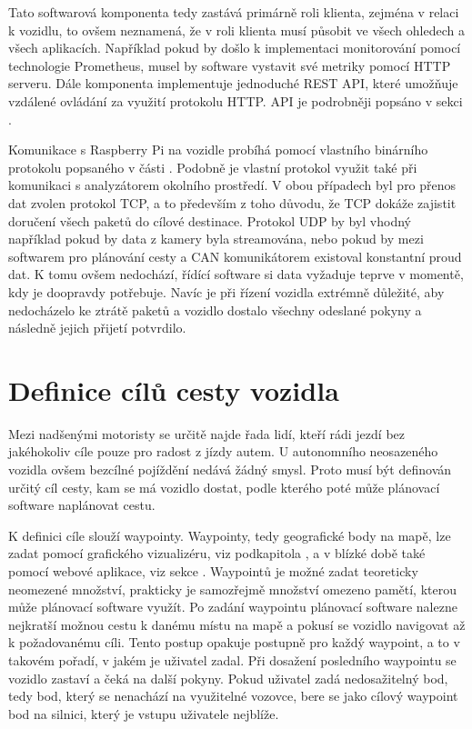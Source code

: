\documentclass[czech, bachelor]{diploma}
\begin{document}
Tato softwarová komponenta tedy zastává primárně roli klienta, zejména v relaci k vozidlu, to ovšem neznamená, že v roli klienta
musí působit ve všech ohledech a všech aplikacích. Například pokud by došlo k implementaci monitorování pomocí technologie
Prometheus, musel by software vystavit své metriky pomocí HTTP serveru. Dále komponenta implementuje jednoduché REST API, které
umožňuje vzdálené ovládání za využití protokolu HTTP. API je podrobněji popsáno v sekci .

Komunikace s Raspberry Pi na vozidle probíhá pomocí vlastního binárního protokolu popsaného v části .
Podobně je vlastní protokol využit také při komunikaci s analyzátorem okolního prostředí. V obou případech byl pro přenos dat
zvolen protokol TCP, a to především z toho důvodu, že TCP dokáže zajistit doručení všech paketů do cílové destinace. Protokol UDP
by byl vhodný například pokud by data z kamery byla streamována, nebo pokud by mezi softwarem pro plánování cesty a CAN
komunikátorem existoval konstantní proud dat. K tomu ovšem nedochází, řídící software si data vyžaduje teprve v momentě, kdy je
doopravdy potřebuje. Navíc je při řízení vozidla extrémně důležité, aby nedocházelo ke ztrátě paketů a vozidlo dostalo všechny
odeslané pokyny a následně jejich přijetí potvrdilo.

\section{Definice cílů cesty vozidla}

Mezi nadšenými motoristy se určitě najde řada lidí, kteří rádi jezdí bez jakéhokoliv cíle pouze pro radost z jízdy autem.
U autonomního neosazeného vozidla ovšem bezcílné pojíždění nedává žádný smysl. Proto musí být definován určitý cíl cesty, kam
se má vozidlo dostat, podle kterého poté může plánovací software naplánovat cestu.

K definici cíle slouží waypointy. Waypointy, tedy geografické body na mapě, lze zadat pomocí grafického vizualizéru,
viz podkapitola , a v blízké době také pomocí webové aplikace, viz sekce . Waypointů je možné
zadat teoreticky neomezené množství, prakticky je samozřejmě množství omezeno pamětí, kterou může plánovací software využít.
Po zadání waypointu plánovací software nalezne nejkratší možnou cestu k danému místu na mapě a pokusí se vozidlo navigovat až
k požadovanému cíli. Tento postup opakuje postupně pro každý waypoint, a to v takovém pořadí, v jakém je uživatel zadal.
Při dosažení posledního waypointu se vozidlo zastaví a čeká na další pokyny. Pokud uživatel zadá nedosažitelný bod, tedy bod,
který se nenachází na využitelné vozovce, bere se jako cílový waypoint bod na silnici, který je vstupu uživatele nejblíže.
\end{document}
